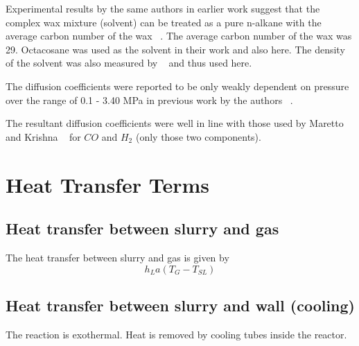 \documentclass{article}
\begin{document}
Experimental results by the same authors in earlier work suggest that the complex wax mixture (solvent) can be treated as a pure n-alkane with the average carbon number of the wax ~\cite{ErkeyRoddenAkgerman1990b}. The average carbon number of the wax was 29. Octacosane was used as the solvent in their work and also here. The density of the solvent was also measured by ~\cite{ErkeyRoddenAkgerman1988} and thus used here.

The diffusion coefficients were reported to be only weakly dependent on pressure over the range of 0.1 - 3.40 MPa in previous work by the authors ~\cite{ErkeyRoddenAkgerman1988}. 

The resultant diffusion coefficients were well in line with those used by Maretto and Krishna ~\cite{MarettoKrishna1999} for $CO$ and $H_2$ (only those two components).


\section{Heat Transfer Terms}

\subsection{Heat transfer between slurry and gas}
The heat transfer between slurry and gas is given by
\begin{equation}
	h_L a (T_G - T_{SL})
\end{equation}

\subsection{Heat transfer between slurry and wall (cooling)}
The reaction is exothermal. Heat is removed by cooling tubes inside the reactor.
\end{document}
